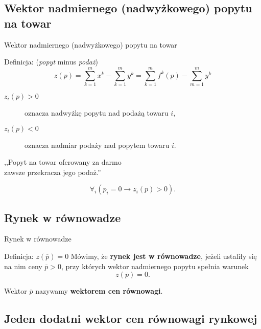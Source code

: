 \documentclass[a4paper, 11pt]{beamer}
\begin{document}
    \subsection{Wektor nadmiernego (nadwyżkowego) popytu na towar}

      \begin{frame}{Wektor nadmiernego (nadwyżkowego) popytu na towar}
	\begin{block}{Definicja: (\textit{popyt} minus \textit{podaż})}
	  $$z(p) = \sum_{k=1}^m x^k - \sum_{k=1}^m y^k = \sum_{k=1}^m f^k (p) -
	  \sum_{m=1}^m y^k$$
	\end{block}

	\begin{description}
	  
	  \item[$z_i (p) > 0$] oznacza nadwyżkę popytu nad podażą towaru $i$,

	  \item[$z_i (p) < 0$] oznacza nadmiar podaży nad popytem towaru $i$.

	\end{description}
	
	\begin{center}
	{\color{green!90!black} ,,Popyt na towar oferowany za darmo\\ zawsze przekracza
	jego podaż.''}
	\end{center}
	\[ \forall_i (p_i=0 \rightarrow z_i (p) > 0). \]

      \end{frame}

    \subsection{Rynek w równowadze}

      \begin{frame}{Rynek w równowadze}
	\begin{block}{Definicja: $z(\overline{p}) = 0$}
	  Mówimy, że \textbf{rynek jest w równowadze}, jeżeli ustaliły się na
	  nim ceny $\overline{p} > 0$, przy których wektor nadmiernego popytu
	  spełnia warunek
	  \[ z(\overline{p}) = 0. \]
	\end{block}

	Wektor $\overline{p}$ nazywamy \textbf{wektorem cen równowagi}.
    \end{frame}
    \subsection{Jeden dodatni wektor cen równowagi rynkowej}
\end{document}
